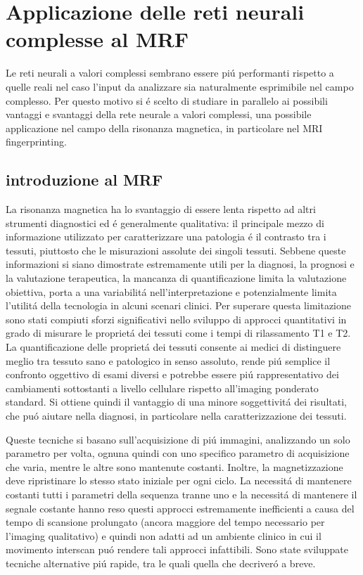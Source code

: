 \documentclass[a4paper,10pt]{article}
\begin{document}
 \section{Applicazione delle reti neurali complesse al MRF}\label{MRIsection}
 
 Le reti neurali a valori complessi sembrano essere pi\'u performanti rispetto a quelle reali nel caso l'input da analizzare sia naturalmente esprimibile nel campo complesso. Per questo motivo si \'e scelto di studiare in parallelo ai possibili vantaggi e svantaggi della rete neurale a valori complessi, una possibile applicazione nel campo della risonanza magnetica, in particolare nel MRI fingerprinting. 
 \subsection{introduzione al MRF}
 
 La risonanza magnetica ha lo svantaggio di essere lenta rispetto ad altri strumenti diagnostici ed \'e generalmente qualitativa: il principale mezzo di informazione utilizzato per caratterizzare una patologia \'e il contrasto tra i tessuti, piuttosto che le misurazioni assolute dei singoli tessuti. Sebbene queste informazioni si siano dimostrate estremamente utili per la diagnosi, la prognosi e la valutazione terapeutica, la mancanza di quantificazione limita la valutazione obiettiva, porta a una variabilit\'a nell'interpretazione e potenzialmente limita l'utilit\'a della tecnologia in alcuni scenari clinici. Per superare questa limitazione sono stati compiuti sforzi significativi nello sviluppo di approcci quantitativi in grado di misurare le propriet\'a dei tessuti come i tempi di rilassamento T1 e T2. La quantificazione delle propriet\'a dei tessuti consente ai medici di distinguere meglio tra tessuto sano e patologico in senso assoluto, rende pi\'u semplice il confronto oggettivo di esami diversi e potrebbe essere pi\'u rappresentativo dei cambiamenti sottostanti a livello cellulare rispetto all'imaging ponderato standard. Si ottiene quindi il vantaggio di una minore soggettivit\'a dei risultati, che pu\'o aiutare nella diagnosi, in particolare nella caratterizzazione dei tessuti.  
 
 Queste tecniche si basano sull'acquisizione di pi\'u immagini, analizzando un solo parametro per volta, ognuna quindi con uno specifico parametro di acquisizione che varia, mentre le altre sono mantenute costanti. Inoltre, la magnetizzazione deve ripristinare lo stesso stato iniziale per ogni ciclo. La necessit\'a di mantenere costanti tutti i parametri della sequenza tranne uno e la necessit\'a di mantenere il segnale costante hanno reso questi approcci estremamente inefficienti a causa del tempo di scansione prolungato (ancora maggiore del tempo necessario per l'imaging qualitativo) e quindi non adatti ad un ambiente clinico in cui il movimento interscan pu\'o rendere tali approcci infattibili. Sono state sviluppate tecniche alternative pi\'u rapide, tra le quali quella che decriver\'o a breve. 
 
\end{document}
